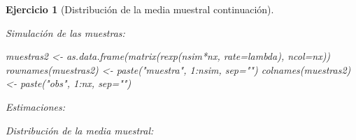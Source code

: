 \documentclass[
  10pt,
]{book}
\newenvironment{Shaded}{\begin{snugshade}}{\end{snugshade}}
\newcommand{\AttributeTok}[1]{\textcolor[rgb]{0.77,0.63,0.00}{#1}}
\newcommand{\DecValTok}[1]{\textcolor[rgb]{0.00,0.00,0.81}{#1}}
\newcommand{\FunctionTok}[1]{\textcolor[rgb]{0.00,0.00,0.00}{#1}}
\newcommand{\NormalTok}[1]{#1}
\newcommand{\OtherTok}[1]{\textcolor[rgb]{0.56,0.35,0.01}{#1}}
\newcommand{\SpecialCharTok}[1]{\textcolor[rgb]{0.00,0.00,0.00}{#1}}
\newcommand{\StringTok}[1]{\textcolor[rgb]{0.31,0.60,0.02}{#1}}
\theoremstyle{break}
\newtheorem{exercise}{Ejercicio}[chapter]
\theoremstyle{nonumberplain}
\begin{document}
\begin{exercise}[Distribución de la media muestral continuación]
\begin{enumerate}
  Simulación de las muestras:

\begin{Shaded}
\begin{Highlighting}[]
\NormalTok{muestras2 }\OtherTok{\textless{}{-}} \FunctionTok{as.data.frame}\NormalTok{(}\FunctionTok{matrix}\NormalTok{(}\FunctionTok{rexp}\NormalTok{(nsim}\SpecialCharTok{*}\NormalTok{nx, }\AttributeTok{rate=}\NormalTok{lambda), }\AttributeTok{ncol=}\NormalTok{nx))}
\FunctionTok{rownames}\NormalTok{(muestras2) }\OtherTok{\textless{}{-}} \FunctionTok{paste}\NormalTok{(}\StringTok{"muestra"}\NormalTok{, }\DecValTok{1}\SpecialCharTok{:}\NormalTok{nsim, }\AttributeTok{sep=}\StringTok{""}\NormalTok{)}
\FunctionTok{colnames}\NormalTok{(muestras2) }\OtherTok{\textless{}{-}} \FunctionTok{paste}\NormalTok{(}\StringTok{"obs"}\NormalTok{, }\DecValTok{1}\SpecialCharTok{:}\NormalTok{nx, }\AttributeTok{sep=}\StringTok{""}\NormalTok{)}
\end{Highlighting}
\end{Shaded}

  Estimaciones:

\begin{Shaded}
\end{Shaded}

  Distribución de la media muestral:


\end{enumerate}
\end{exercise}
\end{document}
